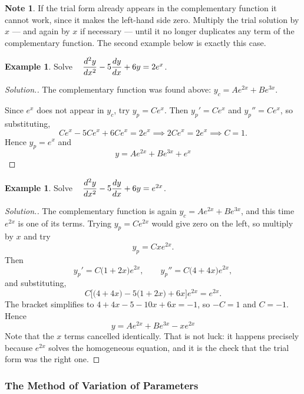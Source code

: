 \documentclass[11pt,a4paper]{article}
\theoremstyle{definition}
\newtheorem{exa}[thm]{Example}
\newtheorem*{note}{Note}
\newenvironment{solution}
  {\renewcommand{\qedsymbol}{}\begin{proof}[\textit{Solution}.]}
  {\end{proof}}
\begin{document}
\begin{note}
If the trial form already appears in the complementary function it cannot work,
since it makes the left-hand side zero. Multiply the trial solution by $x$ ---
and again by $x$ if necessary --- until it no longer duplicates any term of the
complementary function. The second example below is exactly this case.
\end{note}

\begin{exa}
Solve $\hspace{0.3cm}\dfrac{d^2y}{dx^2} - 5\dfrac{dy}{dx} + 6y = 2e^{x}$.
\end{exa}

\begin{solution}
The complementary function was found above:
$y_c = Ae^{2x} + Be^{3x}$.

Since $e^{x}$ does not appear in $y_c$, try $y_p = Ce^{x}$. Then
$y_p' = Ce^{x}$ and $y_p'' = Ce^{x}$, so substituting,
$$Ce^{x} - 5Ce^{x} + 6Ce^{x} = 2e^{x}
\implies 2Ce^{x} = 2e^{x} \implies C = 1 .$$
Hence $y_p = e^{x}$ and
$$\boxed{y = Ae^{2x} + Be^{3x} + e^{x}}$$
\end{solution}

\begin{exa}
Solve $\hspace{0.3cm}\dfrac{d^2y}{dx^2} - 5\dfrac{dy}{dx} + 6y = e^{2x}$.
\end{exa}

\begin{solution}
The complementary function is again $y_c = Ae^{2x} + Be^{3x}$, and this time
$e^{2x}$ is one of its terms. Trying $y_p = Ce^{2x}$ would give zero on the
left, so multiply by $x$ and try
$$y_p = Cxe^{2x}.$$
Then
$$y_p' = C\big(1 + 2x\big)e^{2x},\qquad
y_p'' = C\big(4 + 4x\big)e^{2x},$$
and substituting,
$$C\Big[\big(4 + 4x\big) - 5\big(1 + 2x\big) + 6x\Big]e^{2x} = e^{2x}.$$
The bracket simplifies to $4 + 4x - 5 - 10x + 6x = -1$, so $-C = 1$ and
$C = -1$. Hence
$$\boxed{y = Ae^{2x} + Be^{3x} - xe^{2x}}$$
Note that the $x$ terms cancelled identically. That is not luck: it happens
precisely because $e^{2x}$ solves the homogeneous equation, and it is the check
that the trial form was the right one.
\end{solution}

\subsubsection{The Method of Variation of Parameters}
\end{document}

